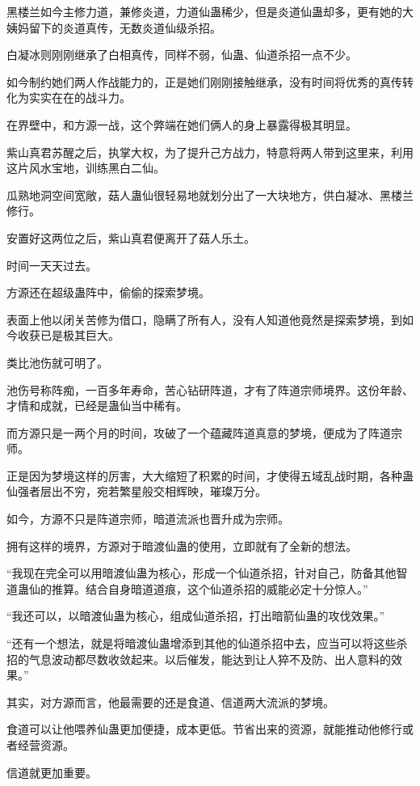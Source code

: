 \begin{this_body}
黑楼兰如今主修力道，兼修炎道，力道仙蛊稀少，但是炎道仙蛊却多，更有她的大姨妈留下的炎道真传，无数炎道仙级杀招。

白凝冰则刚刚继承了白相真传，同样不弱，仙蛊、仙道杀招一点不少。

如今制约她们两人作战能力的，正是她们刚刚接触继承，没有时间将优秀的真传转化为实实在在的战斗力。

在界壁中，和方源一战，这个弊端在她们俩人的身上暴露得极其明显。

紫山真君苏醒之后，执掌大权，为了提升己方战力，特意将两人带到这里来，利用这片风水宝地，训练黑白二仙。

瓜熟地洞空间宽敞，菇人蛊仙很轻易地就划分出了一大块地方，供白凝冰、黑楼兰修行。

安置好这两位之后，紫山真君便离开了菇人乐土。

时间一天天过去。

方源还在超级蛊阵中，偷偷的探索梦境。

表面上他以闭关苦修为借口，隐瞒了所有人，没有人知道他竟然是探索梦境，到如今收获已是极其巨大。

类比池伤就可明了。

池伤号称阵痴，一百多年寿命，苦心钻研阵道，才有了阵道宗师境界。这份年龄、才情和成就，已经是蛊仙当中稀有。

而方源只是一两个月的时间，攻破了一个蕴藏阵道真意的梦境，便成为了阵道宗师。

正是因为梦境这样的厉害，大大缩短了积累的时间，才使得五域乱战时期，各种蛊仙强者层出不穷，宛若繁星般交相辉映，璀璨万分。

如今，方源不只是阵道宗师，暗道流派也晋升成为宗师。

拥有这样的境界，方源对于暗渡仙蛊的使用，立即就有了全新的想法。

“我现在完全可以用暗渡仙蛊为核心，形成一个仙道杀招，针对自己，防备其他智道蛊仙的推算。结合自身暗道道痕，这个仙道杀招的威能必定十分惊人。”

“我还可以，以暗渡仙蛊为核心，组成仙道杀招，打出暗箭仙蛊的攻伐效果。”

“还有一个想法，就是将暗渡仙蛊增添到其他的仙道杀招中去，应当可以将这些杀招的气息波动都尽数收敛起来。以后催发，能达到让人猝不及防、出人意料的效果。”

其实，对方源而言，他最需要的还是食道、信道两大流派的梦境。

食道可以让他喂养仙蛊更加便捷，成本更低。节省出来的资源，就能推动他修行或者经营资源。

信道就更加重要。


\end{this_body}
